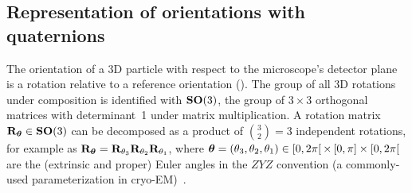 
\subsection{Representation of orientations with quaternions}\label{sec:method:orientation-representation}

The orientation of a 3D particle with respect to the microscope's detector plane is a rotation relative to a reference orientation ().
The group of all 3D rotations under composition is identified with $\mathrm{\mathbf{SO}}(3)$, the group of $3 \times 3$ orthogonal matrices with determinant~1 under matrix multiplication.
A rotation matrix $\mathbf{R}_{{\boldsymbol{\theta}}} \in \mathrm{\mathbf{SO}}(3)$ can be decomposed as a product of $\binom{3}{2}=3$ independent rotations, for example as $\mathbf{R}_{{\boldsymbol{\theta}}} = \mathbf{R}_{\theta_3} \mathbf{R}_{\theta_2} \mathbf{R}_{\theta_1}$, where ${\boldsymbol{\theta}} = (\theta_3,\theta_2,\theta_1) \in [0,2\pi[ \, \times \, [0,\pi] \times [0,2\pi[$ are the (extrinsic and proper) Euler angles in the $ZYZ$ convention (a commonly-used parameterization in cryo-EM)~\cite{sorzano2014interchanging}.

